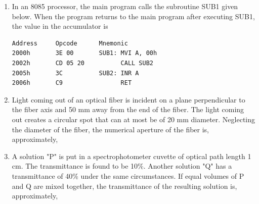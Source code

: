 \documentclass[journal,12pt,onecolumn]{IEEEtran}
\theoremstyle{remark}
\begin{document}
\begin{enumerate}
\item In an 8085 processor, the main program calls the subroutine SUB1 given below. When the program returns to the main program after executing SUB1, the value in the accumulator is
\begin{center}
\begin{verbatim}
Address     Opcode      Mnemonic
2000h       3E 00       SUB1: MVI A, 00h
2002h       CD 05 20          CALL SUB2
2005h       3C          SUB2: INR A
2006h       C9                RET
\end{verbatim}
\end{center}

\hfill{}\begin{enumerate}  \end{enumerate}



\item Light coming out of an optical fiber is incident on a plane perpendicular to the fiber axis and 50 mm away from the end of the fiber. The light coming out creates a circular spot that can at most be of 20 mm diameter. Neglecting the diameter of the fiber, the numerical aperture of the fiber is, approximately,

\hfill{}\begin{enumerate}  \end{enumerate}



\item A solution "P" is put in a spectrophotometer cuvette of optical path length 1 cm. The transmittance is found to be 10\%. Another solution "Q" has a transmittance of 40\% under the same circumstances. If equal volumes of P and Q are mixed together, the transmittance of the resulting solution  is, approximately,


\end{enumerate}
\end{document}
